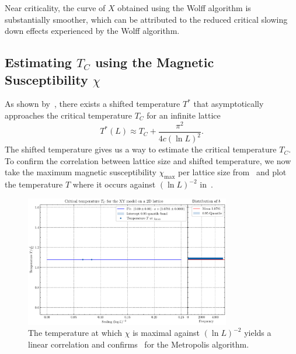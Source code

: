 		Near criticality, the curve of $X$ obtained using the Wolff algorithm is substantially smoother, which can be attributed to the reduced critical slowing down effects experienced by the Wolff algorithm.
	
	\subsection{Estimating \texorpdfstring{$T_C$}{T} using the Magnetic Susceptibility \texorpdfstring{$\chi$}{X}}\label{sec:res:temperature}
		As shown by~\citet[eq. 3]{shifted}, there exists a shifted temperature $T^*$ that asymptotically approaches the critical temperature $T_C$ for an infinite lattice
		\begin{equation}\label{eq:shifted_temperature}
			T^*(L) \approx T_C + \frac{\pi^2}{4c (\ln{L})^2}.
		\end{equation}
		The shifted temperature gives us a way to estimate the critical temperature $T_C$. To confirm the correlation between lattice size and shifted temperature, we now take the maximum magnetic susceptibility $\chi_\text{max}$ per lattice size from~ and plot the temperature $T$ where it occurs against $(\ln{L})^{-2}$ in~.
		\begin{figure}[htbp]
			\centering
			\includegraphics[width=0.8\textwidth]{../figures/Metropolis/Critical_Temperature.pdf}
			\caption[Estimating $T_C$ using the Metropolis algorithm by plotting $T$ where $\chi$ is maximal against $(\ln L)^{-2}$]{The temperature at which $\chi$ is maximal against $(\ln L)^{-2}$ yields a linear correlation and confirms~ for the Metropolis algorithm.}
			\label{fig:critical_temperature}
		\end{figure}
